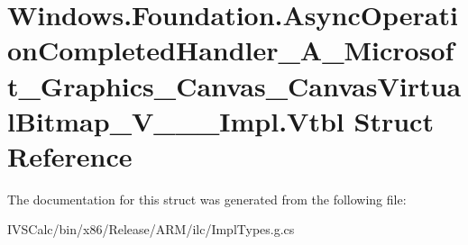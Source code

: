 \hypertarget{struct_windows_1_1_foundation_1_1_async_operation_completed_handler___a___microsoft___graphics__302d945dcfe935e9853165428e85558f}{}\section{Windows.\+Foundation.\+Async\+Operation\+Completed\+Handler\+\_\+\+A\+\_\+\+Microsoft\+\_\+\+Graphics\+\_\+\+Canvas\+\_\+\+Canvas\+Virtual\+Bitmap\+\_\+\+V\+\_\+\+\_\+\+\_\+\+Impl.\+Vtbl Struct Reference}
\label{struct_windows_1_1_foundation_1_1_async_operation_completed_handler___a___microsoft___graphics__302d945dcfe935e9853165428e85558f}


The documentation for this struct was generated from the following file\+:\begin{DoxyCompactItemize}
\item 
I\+V\+S\+Calc/bin/x86/\+Release/\+A\+R\+M/ilc/Impl\+Types.\+g.\+cs\end{DoxyCompactItemize}

